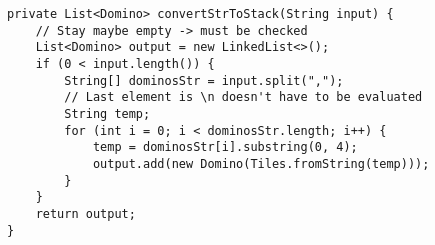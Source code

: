 \begin{lstlisting}[style=CodeHighlighting,float,caption=Converter - convertStrToStack,label=lst:converter_convertStrToStack]
private List<Domino> convertStrToStack(String input) {
    // Stay maybe empty -> must be checked
    List<Domino> output = new LinkedList<>();
    if (0 < input.length()) {
        String[] dominosStr = input.split(",");
        // Last element is \n doesn't have to be evaluated
        String temp;
        for (int i = 0; i < dominosStr.length; i++) {
            temp = dominosStr[i].substring(0, 4);
            output.add(new Domino(Tiles.fromString(temp)));
        }
    }
    return output;
}
\end{lstlisting}